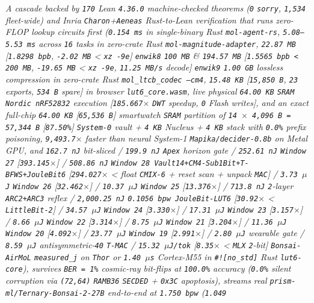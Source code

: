 \documentclass[10pt]{article}
\begin{document}
\vspace{6pt}
\hspace{8pt}%
\parbox{\dimexpr\linewidth-11pt\relax}{%
  \itshape\color{openieSlate}%
  A cascade backed by \texttt{170} Lean \texttt{4.36.0} machine-checked theorems (\texttt{0} \texttt{sorry}, \texttt{1,534} fleet-wide) and Inria \texttt{Charon}+\texttt{Aeneas} Rust-to-Lean verification that runs zero-FLOP lookup circuits first (\texttt{0.154 ms} in single-binary Rust \texttt{mol-agent-rs}, \texttt{5.08--5.53 ms} across \texttt{16} tasks in zero-crate Rust \texttt{mol-magnitude-adapter}, \texttt{22.87 MB} [\texttt{1.8298 bpb}, \texttt{-2.02 MB} < \texttt{xz -9e}] \texttt{enwik8} \texttt{100 MB} \& \texttt{194.57 MB} [\texttt{1.5565 bpb < 200 MB}, \texttt{-19.65 MB} < \texttt{xz -9e}, \texttt{11.25 MB/s} decode] \texttt{enwik9} \texttt{1.00 GB} lossless compression in zero-crate Rust \texttt{mol\_ltcb\_codec --cm4}, \texttt{15.48 KB} [\texttt{15,850 B}, \texttt{23} exports, \texttt{534 B} spare] in browser \texttt{lut6\_core.wasm}, live physical \texttt{64.00 KB} \texttt{SRAM} \texttt{Nordic nRF52832} execution [\texttt{185.667$\times$} \texttt{DWT} speedup, \texttt{0} Flash writes], and an exact full-chip \texttt{64.00 KB} [\texttt{65,536 B}] smartwatch \texttt{SRAM} partition of \texttt{14 $\times$ 4,096 B = 57,344 B} [\texttt{87.50\%}] \texttt{System-0} vault + \texttt{4 KB} Nucleus + \texttt{4 KB} stack with \texttt{0.0\%} prefix poisoning, \texttt{9,493.7$\times$} faster than neural System-1 \texttt{Mapika/decider-0.8b} on Metal GPU, and \texttt{162.7 nJ} bit-sliced / \texttt{199.9 nJ} \texttt{Apex} horizon gate / \texttt{252.61 nJ} \texttt{Window 27} [\texttt{393.145$\times$}] / \texttt{508.86 nJ} \texttt{Window 28 Vault14+CM4-Sub1Bit+T-BFWS+JouleBit6} [\texttt{294.027$\times$} < float \texttt{CMIX-6} + reset scan + unpack \texttt{MAC}] / \texttt{3.73 $\mu$J} \texttt{Window 26} [\texttt{32.462$\times$}] / \texttt{10.37 $\mu$J} \texttt{Window 25} [\texttt{13.376$\times$}] / \texttt{713.8 nJ} \texttt{2}-layer \texttt{ARC2+ARC3} reflex / \texttt{2,000.25 nJ} \texttt{0.1056 bpw JouleBit-LUT6} [\texttt{30.92$\times$} < \texttt{LittleBit-2}] / \texttt{34.57 $\mu$J} \texttt{Window 24} [\texttt{3.330$\times$}] / \texttt{17.31 $\mu$J} \texttt{Window 23} [\texttt{3.157$\times$}] / \texttt{8.66 $\mu$J} \texttt{Window 22} [\texttt{3.314$\times$}] / \texttt{8.75 $\mu$J} \texttt{Window 21} [\texttt{3.204$\times$}] / \texttt{11.36 $\mu$J} \texttt{Window 20} [\texttt{4.092$\times$}] / \texttt{23.77 $\mu$J} \texttt{Window 19} [\texttt{2.991$\times$}] / \texttt{2.80 $\mu$J} wearable gate / \texttt{8.59 $\mu$J} antisymmetric-\texttt{40} \texttt{T-MAC} / \texttt{15.32 $\mu$J/tok} [\texttt{8.35$\times$} < \texttt{MLX} \texttt{2}-bit] \texttt{Bonsai-AirMoL} \texttt{measured\_j} on \texttt{Thor} or \texttt{1.40 $\mu$s} Cortex-M55 in \texttt{\#![no\_std]} Rust \texttt{lut6-core}), survives \texttt{BER = 1\%} cosmic-ray bit-flips at \texttt{100.0\%} accuracy (\texttt{0.0\%} silent corruption via \texttt{(72,64)} \texttt{RAMB36} \texttt{SECDED} + \texttt{0x3C} apoptosis), streams real \texttt{prism-ml/Ternary-Bonsai-2-27B} end-to-end at \texttt{1.750 bpw} (\texttt{1.049} }
\end{document}
